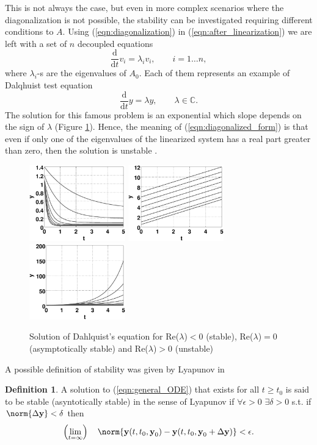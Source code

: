 \documentclass[a4paper,11pt ]{report}
\theoremstyle{definition}
\newtheorem{definition}{Definition}
\begin{document}
This is not always the case, but even in more complex scenarios where the diagonalization is not possible, the stability can be investigated requiring different conditions to $A$. Using (\ref{eqn:diagonalization}) in (\ref{eqn:after_linearization}) we are left with a set of $n$ decoupled equations 
\begin{equation}
\frac{\text{d}}{\text{d} t}v_i=\lambda_i v_i, \qquad i=1\dots n,
\label{eqn:diagonalized_form}
\end{equation}
where $\lambda_i$-s are the eigenvalues of $A_0$. 
Each of them represents an example of Dalqhuist test equation
\begin{equation}
\frac{\text{d}}{\text{d} t}y=\lambda y, \qquad \lambda \in \mathbb{C}.
\end{equation}
The solution for this famous problem is an exponential which slope depends on the sign of $\lambda$ (Figure \ref{fig:Dahlquist}).
Hence, the meaning of (\ref{eqn:diagonalized_form}) is that even if only one of the eigenvalues of the linearized system has a real part greater than zero, then the solution is unstable \cite{Dahlquist}.
\begin{figure}
\includegraphics[width=4.15cm]{img/stable.eps}
\includegraphics[width=4.15cm]{img/asyn_stable.eps}
\includegraphics[width=4.15cm]{img/unstable.eps}
\caption{Solution of Dahlquist's equation for Re($\lambda$)$<0$ (stable), Re($\lambda$)$=0$ (asymptotically stable) and Re($\lambda$)$>0$ (unstable)}
\label{fig:Dahlquist}
\end{figure}
A possible definition of stability was given by Lyapunov in \cite{Lyapunov}
\theoremstyle{definition}
\begin{definition}{}
A solution to (\ref{eqn:general_ODE}) that exists for all $t\geq t_0$ is said to be stable (asyntotically stable) in the sense of Lyapunov if $\forall \epsilon>0$ $\exists \delta >0$ s.t. if $\norm{\Delta \textbf{y}} < \delta$ then
\begin{equation*}
\left( \lim_{t=\infty} \right) \quad \norm{\textbf{y}(t,t_0,\textbf{y}_0)-\textbf{y}(t,t_0,\textbf{y}_0+\Delta \textbf{y})}<\epsilon.
\end{equation*}
\end{definition}
\end{document}
